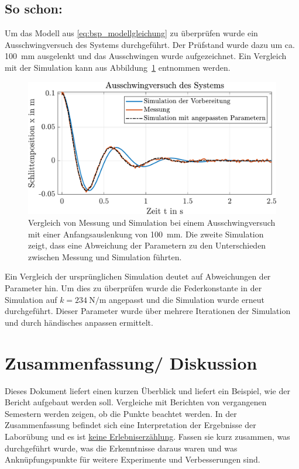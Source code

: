 \subsection{So schon:}
Um das Modell aus \eqref{eq:bsp_modellgleichung} zu überprüfen wurde ein Ausschwingversuch des Systems durchgeführt. Der Prüfstand wurde dazu um ca. \SI{100}{\milli\meter} ausgelenkt und das Ausschwingen wurde aufgezeichnet. Ein Vergleich mit der Simulation kann aus Abbildung~\ref{fig:simulation_und_messung} entnommen werden.
\begin{figure}[!ht]
	\centering
	\includegraphics[width=0.95\linewidth]{images/Vergleich_Sim_und_Messung}
	\caption{Vergleich von Messung und Simulation bei einem Ausschwingversuch mit einer Anfangsauslenkung von \SI{100}{\milli\meter}. Die zweite Simulation zeigt, dass eine Abweichung der Parametern zu den Unterschieden zwischen Messung und Simulation führten.}	   	
	\label{fig:simulation_und_messung}
\end{figure}
Ein Vergleich der ursprünglichen Simulation deutet auf Abweichungen der Parameter hin. Um dies zu überprüfen wurde die Federkonstante in der Simulation auf $k=\SI{234}{\newton\per\meter}$ angepasst und die Simulation wurde erneut durchgeführt. Dieser Parameter wurde über mehrere Iterationen der Simulation und durch händisches anpassen ermittelt.



\section{Zusammenfassung/ Diskussion}
Dieses Dokument liefert einen kurzen Überblick und liefert ein Beispiel, wie der Bericht aufgebaut werden soll. Vergleiche mit Berichten von vergangenen Semestern werden zeigen, ob die Punkte beachtet werden. In der Zusammenfassung befindet sich eine Interpretation der Ergebnisse der Laborübung und es ist \underline{keine Erlebniserzählung}. Fassen sie kurz zusammen, was durchgeführt wurde, was die Erkenntnisse daraus waren und was Anknüpfungspunkte für weitere Experimente und Verbesserungen sind. 

